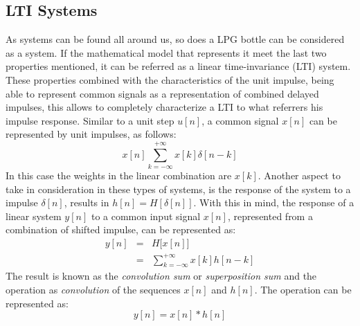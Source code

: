 \subsection{LTI Systems} \label{subsec:LTI}
As systems can be found all around us, so does a LPG bottle can be considered as a system. If the mathematical model that represents it meet the last two properties mentioned, it can be referred as a linear time-invariance (LTI) system. These properties combined with the characteristics of the unit impulse, being able to represent common signals as a representation of combined delayed impulses, this allows to completely characterize a LTI to what referrers his impulse response.\cite{oppenheimSignalsSystems1997}
Similar to a unit step $u[n]$, a common signal $x[n]$ can be represented by unit impulses, as follows:
\begin{equation}
    x[n] \sum_{k=-\infty}^{+\infty} x[k]\delta[n-k]
\end{equation}
In this case the weights in the linear combination are $x[k]$. Another aspect to take in consideration in these types of systems, is the response of the system to a impulse $\delta[n]$, results in $h[n] = H[\delta[n]]$. With this in mind, the response of a linear system $y[n]$ to a common input signal $x[n]$, represented from a combination of shifted impulse, can be represented as:
\begin{equation}
    \begin{matrix}
        y[n] & = & H\big[x[n]\big] \\
        \ & = & \sum_{k=-\infty}^{+\infty} x[k]h[n-k]
    \end{matrix}
\end{equation}
The result is known as the \textit{convolution sum} or \textit{superposition sum} and the operation as \textit{convolution} of the sequences $x[n]$ and $h[n]$. The operation can be represented as:
\begin{equation}
    y[n] = x[n] * h[n]
\end{equation} 
